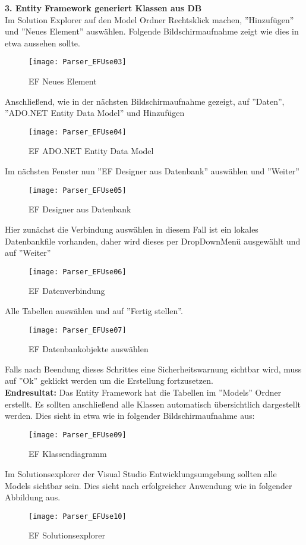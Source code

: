 \textbf{3. Entity Framework generiert Klassen aus DB} \\
Im Solution Explorer auf den Model Ordner Rechtsklick machen, ''Hinzufügen'' und ''Neues Element'' auswählen. Folgende Bildschirmaufnahme zeigt wie dies in etwa aussehen sollte.
\begin{figure}[H]
    \centering
    \texttt{[image: Parser\_EFUse03]}
    \caption{EF Neues Element}
    \label{fig:parsef03}
\end{figure} 
Anschließend, wie in der nächsten Bildschirmaufnahme gezeigt, auf ''Daten'', ''ADO.NET Entity Data Model'' und Hinzufügen
\begin{figure}[H]
    \centering
    \texttt{[image: Parser\_EFUse04]}
    \caption{EF ADO.NET Entity Data Model}
    \label{fig:parsef04}
\end{figure} 
Im nächsten Fenster nun  ''EF Designer aus Datenbank'' auswählen und ''Weiter''
\begin{figure}[H]
    \centering
    \texttt{[image: Parser\_EFUse05]}
    \caption{EF Designer aus Datenbank}
    \label{fig:parsef05}
\end{figure} 
Hier zunächst die Verbindung auswählen in diesem Fall ist ein lokales Datenbankfile vorhanden, daher wird dieses per DropDownMenü ausgewählt und auf ''Weiter''
\begin{figure}[H]
    \centering
    \texttt{[image: Parser\_EFUse06]}
    \caption{EF Datenverbindung}
    \label{fig:parsef06}
\end{figure} 
Alle Tabellen auswählen und auf ''Fertig stellen''. 
\begin{figure}[H]
    \centering
    \texttt{[image: Parser\_EFUse07]}
    \caption{EF Datenbankobjekte auswählen}
    \label{fig:parsef07}
\end{figure} 
Falls nach Beendung dieses Schrittes eine Sicherheitswarnung sichtbar wird, muss auf ''Ok'' geklickt werden um die Erstellung fortzusetzen. \\
\textbf{Endresultat:} Das Entity Framework hat die Tabellen im ''Models'' Ordner erstellt. Es sollten anschließend alle Klassen automatisch übersichtlich dargestellt werden. Dies sieht in etwa wie in folgender Bildschirmaufnahme aus:
\begin{figure}[H]
    \centering
    \texttt{[image: Parser\_EFUse09]}
    \caption{EF Klassendiagramm}
    \label{fig:parsef07}
\end{figure} 
Im Solutionsexplorer der Visual Studio Entwicklungsumgebung sollten alle Models sichtbar sein. Dies sieht nach erfolgreicher Anwendung wie in folgender Abbildung aus. 
\begin{figure}[H]
    \centering
    \texttt{[image: Parser\_EFUse10]}
    \caption{EF Solutionsexplorer}
    \label{fig:parsef07}
\end{figure} 

